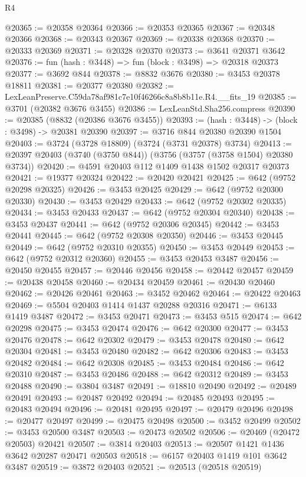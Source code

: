 \begin{lexlean}{R4}
\begin{coremodule}
@20365 := @20358 @20364
@20366 := @20353 @20365
@20367 := @20348 @20366
@20368 := @20343 @20367
@20369 := @20338 @20368
@20370 := @20333 @20369
@20371 := @20328 @20370
@20373 := @3641 @20371 @3642
@20376 := fun (hash : @3448) => fun (block : @3498) => @20318 @20373
@20377 := @3692 @844
@20378 := @8832 @3676
@20380 := @3453 @20378 @18811
@20381 := @20377 @20380
@20382 := LexLeanPreserve.C59da78af981c7e10f46266c8a8b8b11e.R4.__fits_19
@20385 := @3701 (@20382 @3676 @3455)
@20386 := LexLeanStd.Sha256.compress
@20390 := @20385 (@8832 (@20386 @3676 @3455))
@20393 := (hash : @3448) -> (block : @3498) -> @20381 @20390
@20397 := @3716 @844 @20380 @20390 @1504
@20403 := @3724 (@3728 @18809) (@3724 (@3731 @20378) @3734)
@20413 := @20397 @20403 (@3740 (@3750 @844)) (@3756 (@3757 (@3758 @1504) @20380 @3734))
@20420 := @4591 @20403 @112 @1409 @1438 @1502 @20317 @20373
@20421 := @19377 @20324
@20422 := @20420 @20421
@20425 := @642 (@9752 @20298 @20325)
@20426 := @3453 @20425
@20429 := @642 (@9752 @20300 @20330)
@20430 := @3453 @20429
@20433 := @642 (@9752 @20302 @20335)
@20434 := @3453 @20433
@20437 := @642 (@9752 @20304 @20340)
@20438 := @3453 @20437
@20441 := @642 (@9752 @20306 @20345)
@20442 := @3453 @20441
@20445 := @642 (@9752 @20308 @20350)
@20446 := @3453 @20445
@20449 := @642 (@9752 @20310 @20355)
@20450 := @3453 @20449
@20453 := @642 (@9752 @20312 @20360)
@20455 := @3453 @20453 @3487
@20456 := @20450 @20455
@20457 := @20446 @20456
@20458 := @20442 @20457
@20459 := @20438 @20458
@20460 := @20434 @20459
@20461 := @20430 @20460
@20462 := @20426 @20461
@20463 := @3452 @20462
@20464 := @20422 @20463
@20469 := @5504 @20403 @1414 @1437 @20288 @20316
@20471 := @6133 @1419 @3487
@20472 := @3453 @20471
@20473 := @3453 @515
@20474 := @642 @20298
@20475 := @3453 @20474
@20476 := @642 @20300
@20477 := @3453 @20476
@20478 := @642 @20302
@20479 := @3453 @20478
@20480 := @642 @20304
@20481 := @3453 @20480
@20482 := @642 @20306
@20483 := @3453 @20482
@20484 := @642 @20308
@20485 := @3453 @20484
@20486 := @642 @20310
@20487 := @3453 @20486
@20488 := @642 @20312
@20489 := @3453 @20488
@20490 := @3804 @3487
@20491 := @18810 @20490
@20492 := @20489 @20491
@20493 := @20487 @20492
@20494 := @20485 @20493
@20495 := @20483 @20494
@20496 := @20481 @20495
@20497 := @20479 @20496
@20498 := @20477 @20497
@20499 := @20475 @20498
@20500 := @3452 @20499
@20502 := @3453 @20500 @3487
@20503 := @20473 @20502
@20506 := @20469 (@20472 @20503) @20421
@20507 := @3814 @20403
@20513 := @20507 @1421 @1436 @3642 @20287 @20471 @20503
@20518 := @6157 @20403 @1419 @101 @3642 @3487
@20519 := @3872 @20403
@20521 := @20513 (@20518 @20519)

\end{coremodule}
\end{lexlean}
